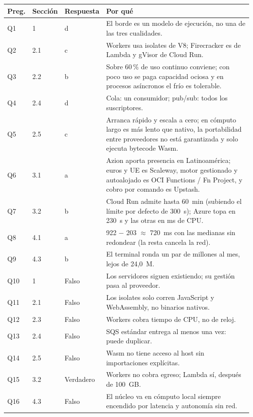 \documentclass[12pt, letterpaper, table, xcdraw]{inf-pucv}
\begin{document}
{\scriptsize
\begin{longtable}{|p{0.9cm}|p{1.1cm}|p{5.6cm}|p{6.2cm}|}
    \hline
    \textbf{Preg.} & \textbf{Sección} & \textbf{Respuesta} & \textbf{Por qué} \\
    \hline
    \endhead
    Q1 & 1 & d & El borde es un modelo de ejecución, no una de las tres cualidades. \\ \hline
    Q2 & 2.1 & c & Workers usa isolates de V8; Firecracker es de Lambda y gVisor de Cloud Run. \\ \hline
    Q3 & 2.2 & b & Sobre 60\,\% de uso continuo conviene; con poco uso se paga capacidad ociosa y en procesos asíncronos el frío es tolerable. \\ \hline
    Q4 & 2.4 & d & Cola: un consumidor; pub/sub: todos los suscriptores. \\ \hline
    Q5 & 2.5 & c & Arranca rápido y escala a cero; en cómputo largo es más lento que nativo, la portabilidad entre proveedores no está garantizada y solo ejecuta bytecode Wasm. \\ \hline
    Q6 & 3.1 & a & Azion aporta presencia en Latinoamérica; euros y UE es Scaleway, motor gestionado y autoalojado es OCI Functions / Fn Project, y cobro por comando es Upstash. \\ \hline
    Q7 & 3.2 & b & Cloud Run admite hasta 60~min (subiendo el límite por defecto de 300~s); Azure topa en 230~s y las otras en ms de CPU. \\ \hline
    Q8 & 4.1 & a & 922 $-$ 203 $\approx$ 720~ms con las medianas sin redondear (la resta cancela la red). \\ \hline
    Q9 & 4.3 & b & El terminal ronda un par de millones al mes, lejos de 24,0~M. \\ \hline
    Q10 & 1 & Falso & Los servidores siguen existiendo; su gestión pasa al proveedor. \\ \hline
    Q11 & 2.1 & Falso & Los isolates solo corren JavaScript y WebAssembly, no binarios nativos. \\ \hline
    Q12 & 2.3 & Falso & Workers cobra tiempo de CPU, no de reloj. \\ \hline
    Q13 & 2.4 & Falso & SQS estándar entrega al menos una vez: puede duplicar. \\ \hline
    Q14 & 2.5 & Falso & Wasm no tiene acceso al host sin importaciones explícitas. \\ \hline
    Q15 & 3.2 & Verdadero & Workers no cobra egreso; Lambda sí, después de 100~GB. \\ \hline
    Q16 & 4.3 & Falso & El núcleo va en cómputo local siempre encendido por latencia y autonomía sin red. \\ \hline

\end{longtable}}
\end{document}
